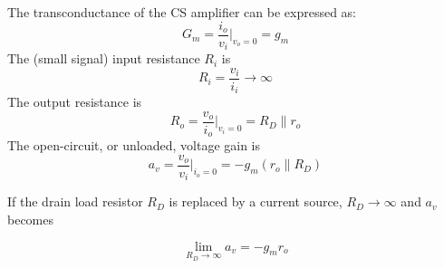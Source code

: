 \documentclass[12pt, a4paper]{article}%
\begin{document}
The transconductance of the CS amplifier can be expressed as:
\begin{equation}
G_m = \frac{i_o}{v_i} \bigg|_{v_o = 0} = g_m
\end{equation}
The (small signal) input resistance \( R_i \) is
\begin{equation}
R_i = \frac{v_i}{i_i} \to \infty
\end{equation}
The output resistance is
\begin{equation}
R_o = \frac{v_o}{i_o} \bigg|_{v_i = 0} = R_D \parallel r_o
\end{equation}
The open-circuit, or unloaded, voltage gain is
\begin{equation}
a_v = \frac{v_o}{v_i} \bigg|_{i_o = 0} = -g_m(r_o \parallel R_D)
\end{equation}

If the drain load resistor \( R_D \) is replaced by a current source, \( R_D \to \infty \) and \( a_v \) becomes

\begin{equation}
\lim_{R_D \to \infty} a_v = -g_mr_o
\end{equation}
\end{document}

